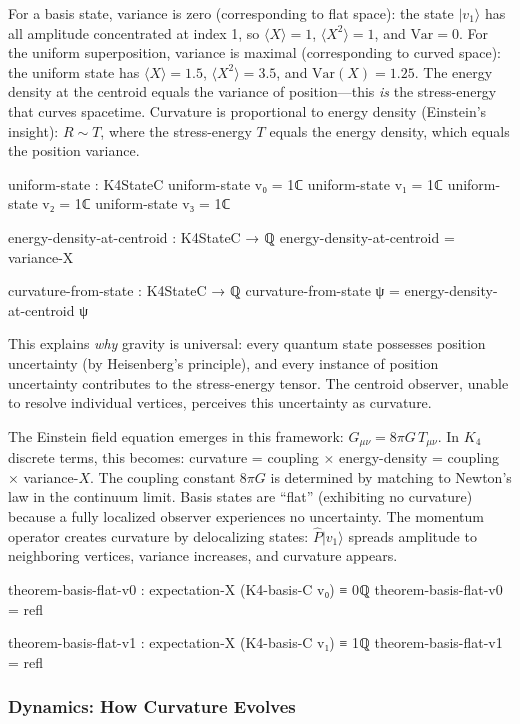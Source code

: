 \documentclass[11pt,a4paper]{book}
\begin{document}
For a basis state, variance is zero (corresponding to flat space): the state $|v_1\rangle$ has all amplitude concentrated at index 1, so $\langle X\rangle = 1$, $\langle X^2\rangle = 1$, and $\text{Var} = 0$. For the uniform superposition, variance is maximal (corresponding to curved space): the uniform state has $\langle X\rangle = 1.5$, $\langle X^2\rangle = 3.5$, and $\text{Var}(X) = 1.25$. The energy density at the centroid equals the variance of position---this \emph{is} the stress-energy that curves spacetime. Curvature is proportional to energy density (Einstein's insight): $R \sim T$, where the stress-energy $T$ equals the energy density, which equals the position variance.

\begin{code}
uniform-state : K4StateC
uniform-state v₀ = 1ℂ
uniform-state v₁ = 1ℂ
uniform-state v₂ = 1ℂ
uniform-state v₃ = 1ℂ

energy-density-at-centroid : K4StateC → ℚ
energy-density-at-centroid = variance-X

curvature-from-state : K4StateC → ℚ
curvature-from-state ψ = energy-density-at-centroid ψ
\end{code}

This explains \emph{why} gravity is universal: every quantum state possesses 
position uncertainty (by Heisenberg's principle), and every instance of position uncertainty 
contributes to the stress-energy tensor. The centroid observer, unable to 
resolve individual vertices, perceives this uncertainty as curvature.

The Einstein field equation emerges in this framework: $G_{\mu\nu} = 8\pi G\, T_{\mu\nu}$. In $K_4$ discrete terms, this becomes: curvature = coupling $\times$ energy-density = coupling $\times$ variance-$X$. The coupling constant $8\pi G$ is determined by matching to Newton's law in the continuum limit. Basis states are ``flat'' (exhibiting no curvature) because a fully localized observer experiences no uncertainty. The momentum operator creates curvature by delocalizing states: $\hat{P}|v_1\rangle$ spreads amplitude to neighboring vertices, variance increases, and curvature appears.

\begin{code}
theorem-basis-flat-v0 : expectation-X (K4-basis-C v₀) ≡ 0ℚ
theorem-basis-flat-v0 = refl

theorem-basis-flat-v1 : expectation-X (K4-basis-C v₁) ≡ 1ℚ
theorem-basis-flat-v1 = refl
\end{code}

\subsubsection{Dynamics: How Curvature Evolves}
\end{document}
